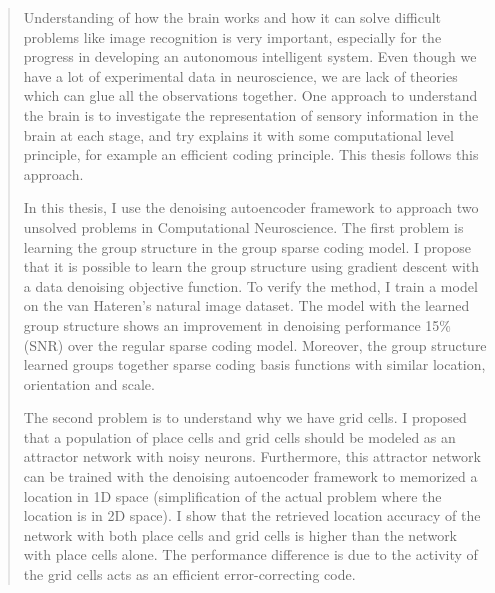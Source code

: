
\begin{abstract}


Understanding of how the brain works and how it can solve difficult problems like image recognition is very important, especially for the progress in developing an autonomous intelligent system. Even though we have a lot of experimental data in neuroscience, we are lack of theories which can glue all the observations together. One approach to understand the brain is to investigate the representation of sensory information in the brain at each stage, and try explains it with some computational level principle, for example an efficient coding principle. This thesis follows this approach.

In this thesis, I use the denoising autoencoder framework to approach two unsolved problems in Computational Neuroscience. The first problem is learning the group structure in the group sparse coding model. I propose that it is possible to learn the group structure using gradient descent with a data denoising objective function. To verify the method, I train a model on the van Hateren's natural image dataset. The model with the learned group structure shows an improvement in denoising performance 15\% (SNR) over the regular sparse coding model. Moreover, the group structure learned groups together sparse coding basis functions with similar location, orientation and scale.

The second problem is to understand why we have grid cells. I proposed that a population of place cells and grid cells should be modeled as an attractor network with noisy neurons. Furthermore, this attractor network can be trained with the denoising autoencoder framework to memorized a location in 1D space (simplification of the actual problem where the location is in 2D space). I show that the retrieved location accuracy of the network with both place cells and grid cells is higher than the network with place cells alone. The performance difference is due to the activity of the grid cells acts as an efficient error-correcting code.

\end{abstract}
